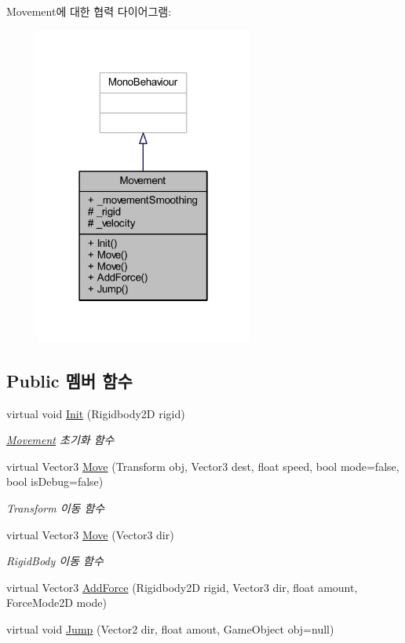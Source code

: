 Movement에 대한 협력 다이어그램\+:\nopagebreak
\begin{figure}[H]
\begin{center}
\leavevmode
\includegraphics[width=202pt]{d6/dad/class_movement__coll__graph}
\end{center}
\end{figure}
\subsection*{Public 멤버 함수}
\begin{DoxyCompactItemize}
\item 
virtual void \mbox{\hyperlink{class_movement_a1c50c07edbe274e1cf55253e87506684}{Init}} (Rigidbody2D rigid)
\begin{DoxyCompactList}\small\item\em \mbox{\hyperlink{class_movement}{Movement}} 초기화 함수 \end{DoxyCompactList}\item 
virtual Vector3 \mbox{\hyperlink{class_movement_ad400f155e0556a5e22a74cb77858460a}{Move}} (Transform obj, Vector3 dest, float speed, bool mode=false, bool is\+Debug=false)
\begin{DoxyCompactList}\small\item\em Transform 이동 함수 \end{DoxyCompactList}\item 
virtual Vector3 \mbox{\hyperlink{class_movement_a0a304da685db92346b7e274c2b0f023e}{Move}} (Vector3 dir)
\begin{DoxyCompactList}\small\item\em Rigid\+Body 이동 함수 \end{DoxyCompactList}\item 
virtual Vector3 \mbox{\hyperlink{class_movement_ab0b20a2f058e2eed15f4bdf0503a2566}{Add\+Force}} (Rigidbody2D rigid, Vector3 dir, float amount, Force\+Mode2D mode)
\item 
virtual void \mbox{\hyperlink{class_movement_a561e8f643a3f3cd6b0b6789c72161e98}{Jump}} (Vector2 dir, float amout, Game\+Object obj=null)
\end{DoxyCompactItemize}
